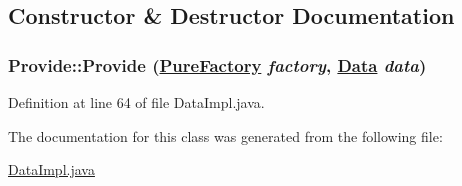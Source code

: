 \subsection{Constructor \& Destructor Documentation}
\hypertarget{classProvide_a0}{
\subsubsection[Provide]{\setlength{\rightskip}{0pt plus 5cm}Provide::Provide (\hyperlink{classPureFactory}{Pure\-Factory} {\em factory}, \hyperlink{interfaceData}{Data} {\em data})}}
\label{classProvide_a0}




Definition at line 64 of file Data\-Impl.java.

The documentation for this class was generated from the following file:\begin{CompactItemize}
\item 
\hyperlink{DataImpl_8java-source}{Data\-Impl.java}\end{CompactItemize}
